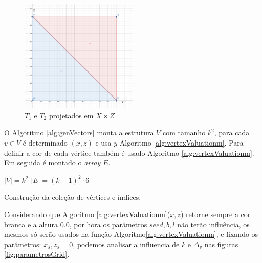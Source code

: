 \begin{figure}[H]
    \centering
    \includegraphics[width=0.5\textwidth]{figuras/t1t2.png}
    \caption{$T_{1}$ e $T_{2}$ projetados em $X \times Z$}
    \label{fig:t1t2}
\end{figure}

O Algoritmo \ref{alg:genVectors} monta a estrutura $V$ com tamanho $k^2$, para cada $v \in V$
é determinado $(x, z)$ e usa $y$ Algoritmo \ref{alg:vertexValuationm}. 
Para definir a cor de cada vértice também é usado Algoritmo \ref{alg:vertexValuationm}. Em seguida é montado o
\textit{array} $E$.
 
\begin{algorithm}[H]\label{alg:genVectors}
    $|V| = k^2$\;
    $|E| = (k-1)^2 \cdot 6$\;
    \caption{Construção da coleção de vértices e índices.}
\end{algorithm}

Considerando que Algoritmo \ref{alg:vertexValuationm}($x, z$) retorne sempre a cor branca
e a altura $0.0$, por hora os parâmetros $seed, b, l$ não terão influência, os mesmos 
só serão usados na função Algoritmo\ref{alg:vertexValuationm}, e fixando os parâmetros: $x_{s}, z_{s} = 0$, 
podemos analisar a influencia de $k$ e $\Delta_{v}$ nas figuras \ref{fig:parametrosGrid}.

